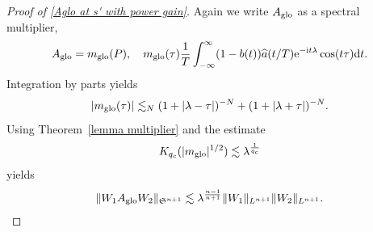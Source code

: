 \documentclass[12pt,reqno,a4paper]{amsart}
\let\coloneq\relax
\newcommand{\coloneq}{\coloneqq}
\newcommand{\rd}{{\rm d}}
\newcommand{\e}{{\rm e}}
\newcommand\I{\mathrm{i}}
\begin{document}
\begin{proof}[Proof of \eqref{Aglo at s' with power gain}]
Again we write  $A_{\rm glo}$ as a spectral multiplier,
  \begin{align}
    A_{\rm glo}=m_{\rm glo}(P),\quad m_{\rm glo}(\tau)\coloneq  \frac{1}{T}\int_{-\infty}^{\infty}(1-b(t))\widehat{a}(t/T)\e^{-\I t\lambda}\cos(t\tau) \rd t .
  \end{align}
  Integration by parts yields
  \begin{align}\label{eq:bound mglo}
    |m_{\rm glo}(\tau)|\lesssim_N (1+|\lambda-\tau|)^{-N}+(1+|\lambda+\tau|)^{-N}.
  \end{align}
  Using Theorem~\ref{lemma multiplier} and the estimate
  \begin{align}
    K_{q_c}(|m_{\rm glo}|^{1/2})
    \lesssim\lambda^{\frac{1}{q_c}}
  \end{align}
  yields 
  \begin{align}\label{eq:A_glo at q=q_c}
    \|W_1A_{\rm glo}W_2\|_{\mathfrak{S}^{n+1}}\lesssim \lambda^{\frac{n-1}{n+1}}\|W_1\|_{L^{n+1}}\|W_2\|_{L^{n+1}}.
  \end{align}


\end{proof}
\end{document}
